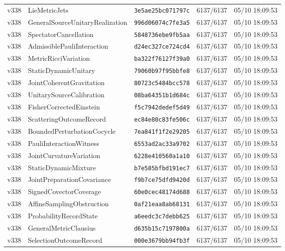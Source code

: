 \documentclass[11pt]{article}
\theoremstyle{definition}\newtheorem{deriv}{Derivation}
\begin{document}
{\begin{longtable}{@{}lllll@{}}
v338 & LieMetricJets & \texttt{3e5ae25bc071797c} & 6137/6137 & 05/10 18:09:53 \\
v338 & GeneralSourceUnitaryRealization & \texttt{996d06074c7fe3a5} & 6137/6137 & 05/10 18:09:53 \\
v338 & SpectatorCancellation & \texttt{5848736ebe9fb5aa} & 6137/6137 & 05/10 18:09:53 \\
v338 & AdmissiblePauliInteraction & \texttt{d24ec327ce724cd4} & 6137/6137 & 05/10 18:09:53 \\
v338 & MetricRicciVariation & \texttt{ba322f76127f39a0} & 6137/6137 & 05/10 18:09:53 \\
v338 & StaticDynamicUnitary & \texttt{79060b97f95bbfe8} & 6137/6137 & 05/10 18:09:53 \\
v338 & JointCoherentGravitation & \texttt{80723c5484bcc578} & 6137/6137 & 05/10 18:09:53 \\
v338 & UnitarySourceCalibration & \texttt{08ba64351b1d684c} & 6137/6137 & 05/10 18:09:53 \\
v338 & FisherCorrectedEinstein & \texttt{f5c7942dedef5d49} & 6137/6137 & 05/10 18:09:53 \\
v338 & ScatteringOutcomeRecord & \texttt{ec84e80c83fe506c} & 6137/6137 & 05/10 18:09:53 \\
v338 & BoundedPerturbationCocycle & \texttt{7ea841f1f2e29205} & 6137/6137 & 05/10 18:09:53 \\
v338 & PauliInteractionWitness & \texttt{6553ad2ac33a9702} & 6137/6137 & 05/10 18:09:53 \\
v338 & JointCurvatureVariation & \texttt{6228e410560a1a10} & 6137/6137 & 05/10 18:09:53 \\
v338 & StaticDynamicMixture & \texttt{b7e585bfbd191ec7} & 6137/6137 & 05/10 18:09:53 \\
v338 & JointPreparationCovariance & \texttt{f9b7ce75dfd9420d} & 6137/6137 & 05/10 18:09:53 \\
v338 & SignedCovectorCoverage & \texttt{60e0cec48174d688} & 6137/6137 & 05/10 18:09:53 \\
v338 & AffineSamplingObstruction & \texttt{0af21eaa8ab68131} & 6137/6137 & 05/10 18:09:53 \\
v338 & ProbabilityRecordState & \texttt{a6eedc3c7debb625} & 6137/6137 & 05/10 18:09:53 \\
v338 & GeneralMetricClausius & \texttt{d635b15c7197800a} & 6137/6137 & 05/10 18:09:53 \\
v338 & SelectionOutcomeRecord & \texttt{000e3679bb94fb3f} & 6137/6137 & 05/10 18:09:53 \\

\end{longtable}}
\end{document}
